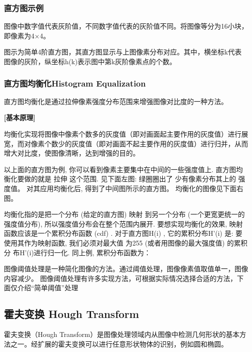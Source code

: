 \documentclass{article}
\begin{document}
\subsubsection{直方图示例}





图像中数字值代表灰阶值，不同数字值代表的灰阶值不同。将图像等分为16小块，即像素为4×4。





图示为简单4阶直方图，其直方图显示与上图像素分布对应。其中，横坐标k代表图像的灰阶，纵坐标h(k)表示图中第k灰阶像素点的个数。





\subsubsection{直方图均衡化Histogram Equalization}

直方图均衡化是通过拉伸像素强度分布范围来增强图像对比度的一种方法。

\textbf{[基本原理]}

均衡化实现将图像中像素个数多的灰度值（即对画面起主要作用的灰度值）进行展宽，而对像素个数少的灰度值（即对画面不起主要作用的灰度值）进行归并，从而增大对比度，使图像清晰，达到增强的目的。


以上面的直方图为例, 你可以看到像素主要集中在中间的一些强度值上. 直方图均衡化要做的就是 拉伸 这个范围. 见下面左图: 绿圈圈出了 少有像素分布其上的 强度值。 对其应用均衡化后, 得到了中间图所示的直方图。 均衡化的图像见下面右图。




均衡化指的是把一个分布 (给定的直方图) 映射 到另一个分布 (一个更宽更统一的强度值分布), 所以强度值分布会在整个范围内展开.
要想实现均衡化的效果, 映射函数应该是一个累积分布函数 (cdf) . 对于直方图H(i) , 它的累积分布H'(i) 是:
要使用其作为映射函数, 我们必须对最大值
     为255 (或者用图像的最大强度值) 的累积分
     布H'(i)进行归一化. 同上例, 累积分布函数为：




图像阈值处理是一种简化图像的方法。通过阈值处理，图像像素值取值单一，图像内容减少。
图像阈值处理有许多实现方法，可根据实际情况选择合适的方法，下面仅介绍“简单阈值”处理
 



\subsection{霍夫变换
Hough Transform}
霍夫变换（Hough Transform）是图像处理领域内从图像中检测几何形状的基本方法之一。经扩展的霍夫变换可以进行任意形状物体的识别，例如圆和椭圆。
\end{document}
